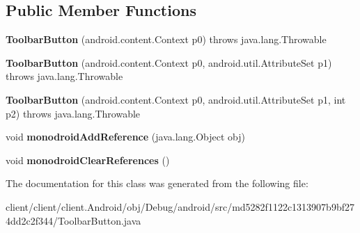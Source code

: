 \subsection*{Public Member Functions}
\begin{DoxyCompactItemize}
\item 
\hypertarget{classmd5282f1122c1313907b9bf274dd2c2f344_1_1ToolbarButton_a31f5249c9f9bfa1e015d9865db53cce1}{}{\bfseries Toolbar\+Button} (android.\+content.\+Context p0)  throws java.\+lang.\+Throwable 	\label{classmd5282f1122c1313907b9bf274dd2c2f344_1_1ToolbarButton_a31f5249c9f9bfa1e015d9865db53cce1}

\item 
\hypertarget{classmd5282f1122c1313907b9bf274dd2c2f344_1_1ToolbarButton_a4b9161d2c7eb13b502779c990eb0621e}{}{\bfseries Toolbar\+Button} (android.\+content.\+Context p0, android.\+util.\+Attribute\+Set p1)  throws java.\+lang.\+Throwable 	\label{classmd5282f1122c1313907b9bf274dd2c2f344_1_1ToolbarButton_a4b9161d2c7eb13b502779c990eb0621e}

\item 
\hypertarget{classmd5282f1122c1313907b9bf274dd2c2f344_1_1ToolbarButton_af4126fe374537176758dd740095ec77e}{}{\bfseries Toolbar\+Button} (android.\+content.\+Context p0, android.\+util.\+Attribute\+Set p1, int p2)  throws java.\+lang.\+Throwable 	\label{classmd5282f1122c1313907b9bf274dd2c2f344_1_1ToolbarButton_af4126fe374537176758dd740095ec77e}

\item 
\hypertarget{classmd5282f1122c1313907b9bf274dd2c2f344_1_1ToolbarButton_a03bb80af780d73c139e95d936109e195}{}void {\bfseries monodroid\+Add\+Reference} (java.\+lang.\+Object obj)\label{classmd5282f1122c1313907b9bf274dd2c2f344_1_1ToolbarButton_a03bb80af780d73c139e95d936109e195}

\item 
\hypertarget{classmd5282f1122c1313907b9bf274dd2c2f344_1_1ToolbarButton_a7b15382972ecc2f820cfe742e17bb2db}{}void {\bfseries monodroid\+Clear\+References} ()\label{classmd5282f1122c1313907b9bf274dd2c2f344_1_1ToolbarButton_a7b15382972ecc2f820cfe742e17bb2db}

\end{DoxyCompactItemize}


The documentation for this class was generated from the following file\+:\begin{DoxyCompactItemize}
\item 
client/client/client.\+Android/obj/\+Debug/android/src/md5282f1122c1313907b9bf274dd2c2f344/Toolbar\+Button.\+java\end{DoxyCompactItemize}

